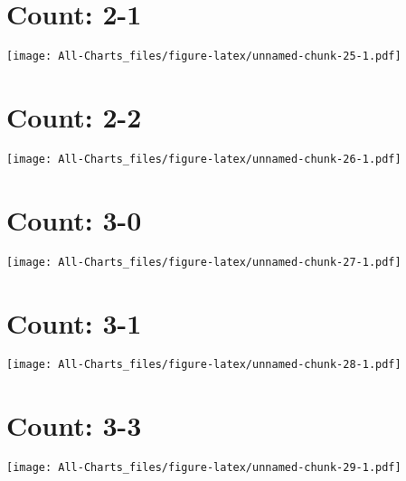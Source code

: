 \documentclass[]{article}
\begin{document}
\section{Count: 2-1}\label{count-2-1}

\texttt{[image: All-Charts\_files/figure-latex/unnamed-chunk-25-1.pdf]}

\section{Count: 2-2}\label{count-2-2}

\texttt{[image: All-Charts\_files/figure-latex/unnamed-chunk-26-1.pdf]}

\section{Count: 3-0}\label{count-3-0}

\texttt{[image: All-Charts\_files/figure-latex/unnamed-chunk-27-1.pdf]}

\section{Count: 3-1}\label{count-3-1}

\texttt{[image: All-Charts\_files/figure-latex/unnamed-chunk-28-1.pdf]}

\section{Count: 3-3}\label{count-3-3}

\texttt{[image: All-Charts\_files/figure-latex/unnamed-chunk-29-1.pdf]}
\end{document}
